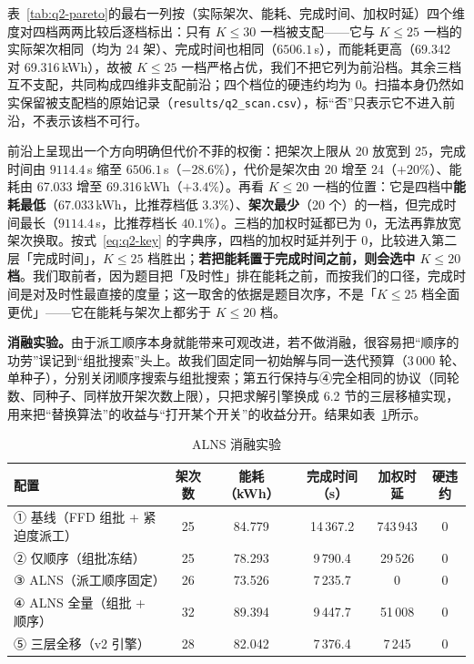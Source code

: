 表~\ref{tab:q2-pareto}的最右一列按（实际架次、能耗、完成时间、加权时延）四个维度对四档两两比较后逐档标出：只有 $K\le30$ 一档被支配——它与 $K\le25$ 一档的实际架次相同（均为 24 架）、完成时间也相同（$6506.1$\,s），而能耗更高（69.342 对 69.316\,kWh），故被 $K\le25$ 一档严格占优，我们不把它列为前沿档。其余三档互不支配，共同构成四维非支配前沿；四个档位的硬违约均为 $0$。扫描本身仍然如实保留被支配档的原始记录（\texttt{results/q2\_scan.csv}），标“否”只表示它不进入前沿，不表示该档不可行。

前沿上呈现出一个方向明确但代价不菲的权衡：把架次上限从 20 放宽到 25，完成时间由 $9114.4$\,s 缩至 $6506.1$\,s（$-28.6\%$），代价是架次由 20 增至 24（$+20\%$）、能耗由 67.033 增至 69.316\,kWh（$+3.4\%$）。再看 $K\le20$ 一档的位置：它是四档中\textbf{能耗最低}（$67.033$\,kWh，比推荐档低 $3.3\%$）、\textbf{架次最少}（20 个）的一档，但完成时间最长（$9114.4$\,s，比推荐档长 $40.1\%$）。三档的加权时延都已为 $0$，无法再靠放宽架次换取。按式~\eqref{eq:q2-key} 的字典序，四档的加权时延并列于 $0$，比较进入第二层「完成时间」，$K\le25$ 档胜出；\textbf{若把能耗置于完成时间之前，则会选中 $K\le20$ 档}。我们取前者，因为题目把「及时性」排在能耗之前，而按我们的口径，完成时间是对及时性最直接的度量；这一取舍的依据是题目次序，不是「$K\le25$ 档全面更优」——它在能耗与架次上都劣于 $K\le20$ 档。

\textbf{消融实验。}由于派工顺序本身就能带来可观改进，若不做消融，很容易把“顺序的功劳”误记到“组批搜索”头上。故我们固定同一初始解与同一迭代预算（$3\,000$ 轮、单种子），分别关闭顺序搜索与组批搜索；第五行保持与④完全相同的协议（同轮数、同种子、同样放开架次数上限），只把求解引擎换成 6.2 节的三层移植实现，用来把“替换算法”的收益与“打开某个开关”的收益分开。结果如表~\ref{tab:q2-ablation}所示。

\begin{table}[htbp]
	\caption{ALNS 消融实验}
	\label{tab:q2-ablation}
	\centering
	\small
	\begin{tabular}{lccccc}
		\toprule
		配置 & 架次数 & 能耗（kWh） & 完成时间（s） & 加权时延 & 硬违约 \\
		\midrule
		① 基线（FFD 组批 + 紧迫度派工） & 25 & 84.779 & 14\,367.2 & 743\,943 & 0 \\
		② 仅顺序（组批冻结） & 25 & 78.293 & 9\,790.4 & 29\,526 & 0 \\
		③ ALNS（派工顺序固定） & 26 & 73.526 & 7\,235.7 & 0 & 0 \\
		④ ALNS 全量（组批 + 顺序） & 32 & 89.394 & 9\,447.7 & 51\,008 & 0 \\
		⑤ 三层全移（v2 引擎） & 28 & 82.042 & 7\,376.4 & 7\,245 & 0 \\
		\bottomrule
	\end{tabular}
\end{table}

